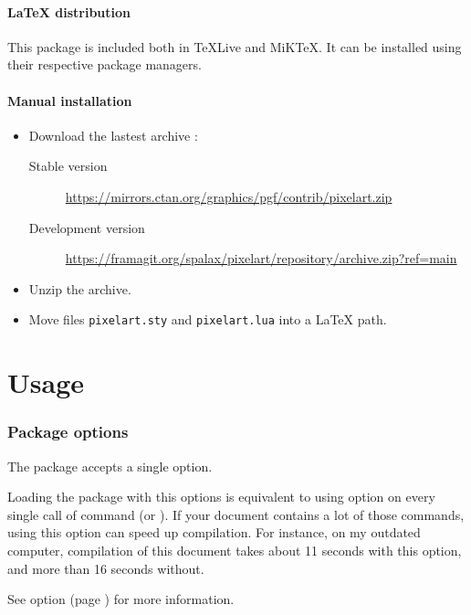 \documentclass[
  load-preamble-,
  babel-options=english,
  add-index=true,
]{cnltx-doc}
\begin{document}
\subsection{LaTeX distribution}

This package is included both in \TeX{}Live and MiK\TeX{}. It can be installed using their respective package managers.

\subsection{Manual installation}

\begin{itemize}
\item Download the lastest archive :
\begin{description}
\item[Stable version] \url{https://mirrors.ctan.org/graphics/pgf/contrib/pixelart.zip}
\item[Development version] \url{https://framagit.org/spalax/pixelart/repository/archive.zip?ref=main}
\end{description}
\item Unzip the archive.
\item Move files \texttt{pixelart.sty} and \texttt{pixelart.lua} into a \LaTeX{} path.
\end{itemize}

\part{Usage}
\label{part:usage}

\section{Package options}

The package accepts a single option.

\begin{options}
   Loading the package with this options is equivalent to using option  on every single call of command  (or ). If your document contains a lot of those commands, using this option can speed up compilation.
  For instance, on my outdated computer, compilation of this document takes about 11 seconds with this option, and more than 16 seconds without.

  See option  (page \pageref{option:draft}) for more information.
\end{options}
\end{document}
